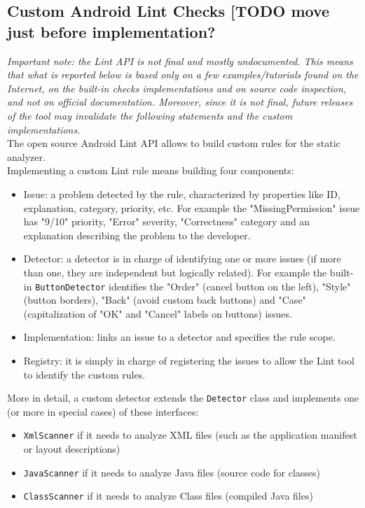 \documentclass[11pt,a4paper,notitlepage]{article}
\begin{document}
\subsection{Custom Android Lint Checks [TODO move just before implementation?}
\textit{Important note: the Lint API is not final and mostly undocumented. This means that what is reported below is based only on a few examples/tutorials found on the Internet, on the built-in checks implementations and on source code inspection, and not on official documentation. Moreover, since it is not final, future releases of the tool may invalidate the following statements and the custom implementations.}\bigskip \\
The open source Android Lint API allows to build custom rules for the static analyzer.\medskip \\
Implementing a custom Lint rule means building four components:
\begin{itemize}
	\item Issue: a problem detected by the rule, characterized by properties like ID, explanation, category, priority, etc. For example the "MissingPermission" issue has "9/10" priority, "Error" severity, "Correctness" category and an explanation describing the problem to the developer.
	\item Detector: a detector is in charge of identifying one or more issues (if more than one, they are independent but logically related). For example the built-in \texttt{ButtonDetector} identifies the "Order" (cancel button on the left), "Style" (button borders), "Back" (avoid custom back buttons) and "Case" (capitalization of "OK" and "Cancel" labels on buttons) issues.
	\item Implementation: links an issue to a detector and specifies the rule scope.
	\item Registry: it is simply in charge of registering the issues to allow the Lint tool to identify the custom rules.
\end{itemize}\bigskip
More in detail, a custom detector extends the \texttt{Detector} class and implements one (or more in special cases) of these interfaces:
\begin{itemize}
	\item \texttt{XmlScanner} if it needs to analyze XML files (such as the application manifest or layout descriptions)
	\item \texttt{JavaScanner} if it needs to analyze Java files (source code for classes)
	\item \texttt{ClassScanner} if it needs to analyze Class files (compiled Java files)
\end{itemize}
\end{document}
